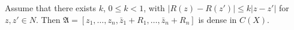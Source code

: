 
Assume that there exists $k$, $0 \leq k < 1$, with $|R(z) - R(z')| \leq k|z - z'|$ for $z, z' \in N$. Then $\mathfrak{A} = [z_1, \ldots, z_n, \bar{z}_1 + R_1, \ldots, \bar{z}_n + R_n]$ is dense in $C(X)$.
